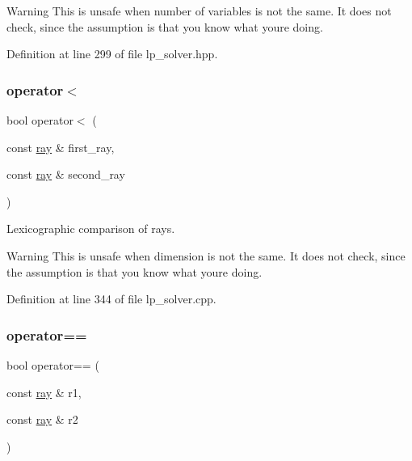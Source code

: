 \begin{DoxyWarning}{Warning}
This is unsafe when number of variables is not the same. It does not check, since the assumption is that you know what you\textquotesingle{}re doing. 
\end{DoxyWarning}


Definition at line 299 of file lp\+\_\+solver.\+hpp.

\mbox{\label{classray_a5909f048e7cf014f880adb43da3862d3}} 
\subsubsection{\texorpdfstring{operator$<$}{operator<}}
{\footnotesize\ttfamily bool operator$<$ (\begin{DoxyParamCaption}\item[{const \hyperlink{classray}{ray} \&}]{first\+\_\+ray,  }\item[{const \hyperlink{classray}{ray} \&}]{second\+\_\+ray }\end{DoxyParamCaption})\hspace{0.3cm}{\ttfamily [friend]}}



Lexicographic comparison of rays. 

\begin{DoxyWarning}{Warning}
This is unsafe when dimension is not the same. It does not check, since the assumption is that you know what you\textquotesingle{}re doing. 
\end{DoxyWarning}


Definition at line 344 of file lp\+\_\+solver.\+cpp.

\mbox{\label{classray_ae27bf49e1b2756797f82fea0bf810dfd}} 
\subsubsection{\texorpdfstring{operator==}{operator==}\hspace{0.1cm}{\footnotesize\ttfamily [1/2]}}
{\footnotesize\ttfamily bool operator== (\begin{DoxyParamCaption}\item[{const \hyperlink{classray}{ray} \&}]{r1,  }\item[{const \hyperlink{classray}{ray} \&}]{r2 }\end{DoxyParamCaption})\hspace{0.3cm}{\ttfamily [friend]}}



